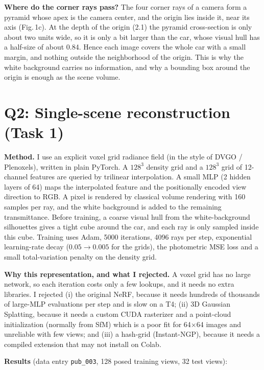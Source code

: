 \documentclass[11pt]{article}
\begin{document}
\textbf{Where do the corner rays pass?}
The four corner rays of a camera form a pyramid whose apex is the camera center, and the origin lies inside it, near its axis (Fig.\,1c). At the depth of the origin (2.1) the pyramid cross-section is only about two units wide, so it is only a bit larger than the car, whose visual hull has a half-size of about 0.84. Hence each image covers the whole car with a small margin, and nothing outside the neighborhood of the origin. This is why the white background carries no information, and why a bounding box around the origin is enough as the scene volume.

\section*{Q2: Single-scene reconstruction (Task 1)}

\textbf{Method.}
I use an explicit voxel grid radiance field (in the style of DVGO / Plenoxels), written in plain PyTorch. A $128^3$ density grid and a $128^3$ grid of 12-channel features are queried by trilinear interpolation. A small MLP (2 hidden layers of 64) maps the interpolated feature and the positionally encoded view direction to RGB. A pixel is rendered by classical volume rendering with 160 samples per ray, and the white background is added to the remaining transmittance. Before training, a coarse visual hull from the white-background silhouettes gives a tight cube around the car, and each ray is only sampled inside this cube. Training uses Adam, 5000 iterations, 4096 rays per step, exponential learning-rate decay ($0.05\to0.005$ for the grids), the photometric MSE loss and a small total-variation penalty on the density grid.

\textbf{Why this representation, and what I rejected.}
A voxel grid has no large network, so each iteration costs only a few lookups, and it needs no extra libraries. I rejected (i) the original NeRF, because it needs hundreds of thousands of large-MLP evaluations per step and is slow on a T4; (ii) 3D Gaussian Splatting, because it needs a custom CUDA rasterizer and a point-cloud initialization (normally from SfM) which is a poor fit for 64$\times$64 images and unreliable with few views; and (iii) a hash-grid (Instant-NGP), because it needs a compiled extension that may not install on Colab.

\textbf{Results} (data entry \texttt{pub\_003}, 128 posed training views, 32 test views):
\end{document}
